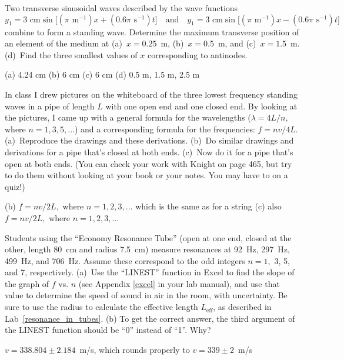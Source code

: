 \begin{Exercise}
Two transverse sinusoidal waves described by the wave functions
\[y_1=3\text{~cm} \sin\Big[ \left( \pi \text{~m}^{-1}\right) x + \left( 0.6\pi \text{~s}^{-1} \right) t\Big] 
\quad \text{and} \quad
  y_1=3\text{~cm} \sin\Big[ \left( \pi \text{~m}^{-1}\right) x - \left( 0.6\pi \text{~s}^{-1} \right) t\Big] 
\]
combine to form a standing wave.  
Determine the maximum transverse position of an element of the medium at (a)~$x=0.25$~m, (b)~$x=0.5$~m, and (c)~$x=1.5$~m.  
(d)~Find the three smallest values of $x$ corresponding to antinodes.  
\end{Exercise}
\begin{Answer}
(a) 4.24 cm (b) 6 cm (c) 6 cm (d) 0.5 m, 1.5 m, 2.5 m
\end{Answer}


\begin{Exercise}
In class I drew pictures on the whiteboard of the three lowest frequency standing waves in a pipe of length $L$ with one open end and one closed end.  
By looking at the pictures, I came up with a general formula for the wavelengths 
($\lambda = 4 L / n,$ where $n=1,3,5,...$) 
and a corresponding formula for the frequencies: $f=nv/4L$.  
(a)~Reproduce the drawings and these derivations.  
(b)~Do similar drawings and derivations for a pipe that's closed at both ends.  
(c)~Now do it for a pipe that's open at both ends.  
(You can check your work with Knight on page 465, but try to do them without looking at your book or your notes.  You may have to on a quiz!)
\end{Exercise}
\begin{Answer}
(b) $f=nv/2L,$ where $n=1,2,3,...$ which is the same as for a string 
(c) also $f=nv/2L,$ where $n=1,2,3,...$
\end{Answer}

\begin{Exercise}
Students using the ``Economy Resonance Tube'' (open at one end, closed at the other, length 80~cm and radius 7.5~cm) measure resonances at 92~Hz, 297~Hz, 499~Hz, and 706~Hz.  
Assume these correspond to the odd integers $n=1,$ 3, 5, and 7, respectively.  
(a)~Use the ``LINEST'' function in Excel to find the slope of the graph of $f$ vs. $n$ (see Appendix \ref{excel} in your lab manual), and use that value to determine the speed of sound in air in the room, with uncertainty.  Be sure to use the radius to calculate the effective length $L_\text{eff}$, as described in Lab~\ref{resonance_in_tubes}. 
(b) To get the correct answer, the third argument of the LINEST function should be ``0'' instead of ``1''.  Why? \end{Exercise}
\begin{Answer}
$v=338.804 \pm 2.184$~m/s, which rounds properly to $v=339 \pm 2$~m/s
\end{Answer}

